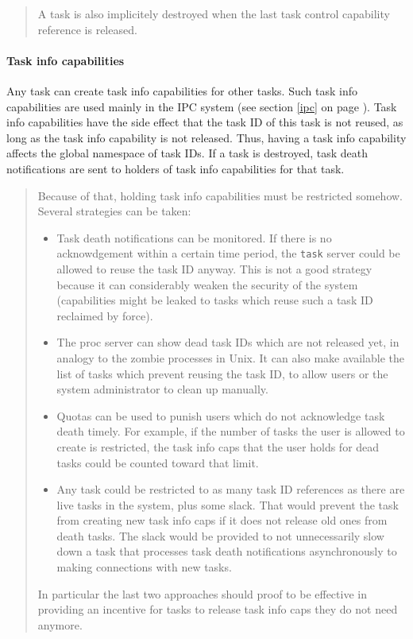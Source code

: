 \documentclass[9pt,a4paper]{extarticle}
\newenvironment{comment}{\footnotesize \begin{quote}}{\end{quote}}
\begin{document}
\begin{comment}
  A task is also implicitely destroyed when the last task control
  capability reference is released.
\end{comment}

\paragraph{Task info capabilities}
\label{taskinfocap}
Any task can create task info capabilities for other tasks.  Such task
info capabilities are used mainly in the IPC system (see section
\ref{ipc} on page \pageref{ipc}).  Task info capabilities have the
side effect that the task ID of this task is not reused, as long as
the task info capability is not released.  Thus, having a task info
capability affects the global namespace of task IDs.  If a task is
destroyed, task death notifications are sent to holders of task info
capabilities for that task.

\begin{comment}
  Because of that, holding task info capabilities must be restricted
  somehow.  Several strategies can be taken:

  \begin{itemize}
  \item Task death notifications can be monitored.  If there is no
    acknowdgement within a certain time period, the \texttt{task}
    server could be allowed to reuse the task ID anyway.  This is not
    a good strategy because it can considerably weaken the security of
    the system (capabilities might be leaked to tasks which reuse such
    a task ID reclaimed by force).
  \item The proc server can show dead task IDs which are not released
    yet, in analogy to the zombie processes in Unix.  It can also make
    available the list of tasks which prevent reusing the task ID, to
    allow users or the system administrator to clean up manually.
  \item Quotas can be used to punish users which do not acknowledge
    task death timely.  For example, if the number of tasks the user
    is allowed to create is restricted, the task info caps that the
    user holds for dead tasks could be counted toward that limit.
  \item Any task could be restricted to as many task ID references as
    there are live tasks in the system, plus some slack.  That would
    prevent the task from creating new task info caps if it does not
    release old ones from death tasks.  The slack would be provided to
    not unnecessarily slow down a task that processes task death
    notifications asynchronously to making connections with new tasks.
  \end{itemize}
  
  In particular the last two approaches should proof to be effective
  in providing an incentive for tasks to release task info caps they
  do not need anymore.
\end{comment}
\end{document}
